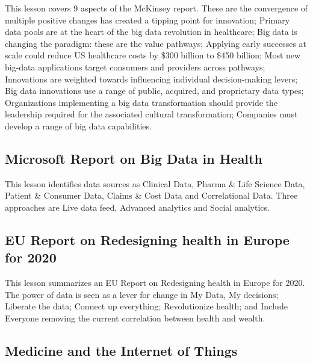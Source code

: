 This lesson covers 9 aspects of the McKinsey report. These are the
convergence of multiple positive changes has created a tipping point for
innovation; Primary data pools are at the heart of the big data
revolution in healthcare; Big data is changing the paradigm: these are
the value pathways; Applying early successes at scale could reduce US
healthcare costs by \$300 billion to \$450 billion; Most new big-data
applications target consumers and providers across pathways; Innovations
are weighted towards influencing individual decision-making levers; Big
data innovations use a range of public, acquired, and proprietary data
types; Organizations implementing a big data transformation should
provide the leadership required for the associated cultural
transformation; Companies must develop a range of big data capabilities.


\subsection{Microsoft Report on Big Data in Health}

This lesson identifies data sources as Clinical Data, Pharma \& Life
Science Data, Patient \& Consumer Data, Claims \& Cost Data and
Correlational Data. Three approaches are Live data feed, Advanced
analytics and Social analytics.



\subsection{EU Report on Redesigning health in Europe for 2020}

This lesson summarizes an EU Report on Redesigning health in Europe for
2020. The power of data is seen as a lever for change in My Data, My
decisions; Liberate the data; Connect up everything; Revolutionize
health; and Include Everyone removing the current correlation between
health and wealth.




\subsection{Medicine and the Internet of Things}

